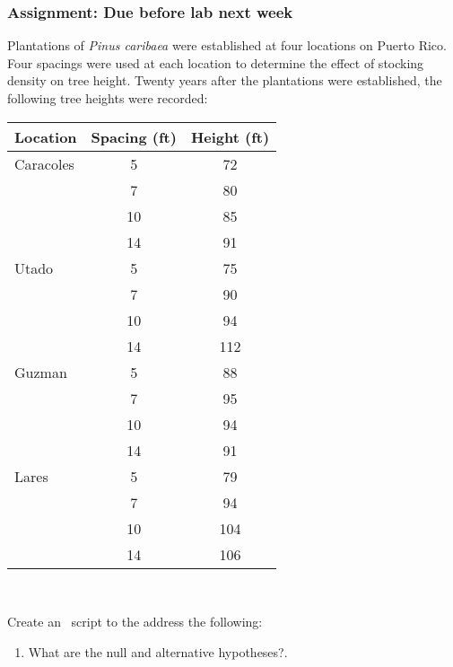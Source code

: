 \documentclass[color=usenames,dvipsnames]{beamer}\usepackage[]{graphicx}\usepackage[]{color}
\begin{document}
\begin{frame}
  \frametitle{Assignment: Due before lab next week}
  \tiny
  Plantations of {\it Pinus caribaea} were established at
  four locations on Puerto Rico.  %
  Four spacings were used at each location to determine the effect of
  stocking density on tree height. Twenty years after the
  plantations were established, the following tree heights were
  recorded: \\ %
  \vfill
  {  \centering
    \tiny %
    \begin{tabular}{lcc}
      \hline
      Location  & Spacing (ft) & Height (ft) \\
      \hline
      Caracoles & 5            & 72          \\
                & 7            & 80          \\
                & 10           & 85          \\
                & 14           & 91          \\
      Utado     & 5            & 75          \\
                & 7            & 90          \\
                & 10           & 94          \\
                & 14           & 112         \\
      Guzman    & 5            & 88          \\
                & 7            & 95          \\
                & 10           & 94          \\
                & 14           & 91          \\
      Lares     & 5            & 79          \\
                & 7            & 94          \\
                & 10           & 104         \\
                & 14           & 106         \\
      \hline
    \end{tabular} \\
  }
    Create an \R~script to the address the following:
    \begin{enumerate}[(1)]
      \item What are the null and alternative hypotheses?.

\end{enumerate}
\end{frame}
\end{document}
